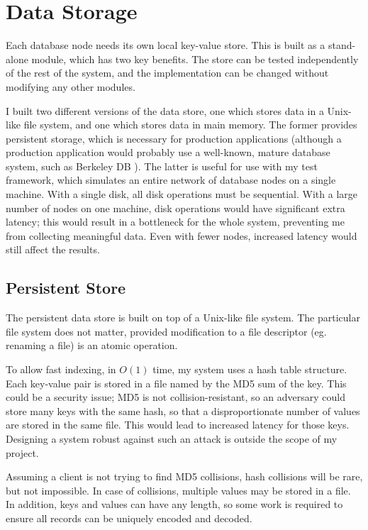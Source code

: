 \documentclass[12pt,a4paper,twoside,openany]{report}
\begin{document}
\section{Data Storage}

Each database node needs its own local key-value store.
This is built as a stand-alone module, which has two key benefits. The store can be tested independently of the rest of the system, and the implementation can be changed without modifying any other modules.

I built two different versions of the data store, one which stores data in a Unix-like file system, and one which stores data in main memory. The former provides persistent storage, which is necessary for production applications (although a production application would probably use a well-known, mature database system, such as Berkeley DB \cite{decandia2007dynamo}). The latter is useful for use with my test framework, which simulates an entire network of database nodes on a single machine.
With a single disk, all disk operations must be sequential. With a large number of nodes on one machine, disk operations would have significant extra latency; this would result in a bottleneck for the whole system, preventing me from collecting meaningful data. Even with fewer nodes, increased latency would still affect the results.

\subsection{Persistent Store}

The persistent data store is built on top of a Unix-like file system. The particular file system does not matter, provided modification to a file descriptor (eg. renaming a file) is an atomic operation.

To allow fast indexing, in $O(1)$ time, my system uses a hash table structure. Each key-value pair is stored in a file named by the MD5 sum of the key. This could be a security issue; MD5 is not collision-resistant, so an adversary could store many keys with the same hash, so that a disproportionate number of values are stored in the same file. This would lead to increased latency for those keys. Designing a system robust against such an attack is outside the scope of my project.

Assuming a client is not trying to find MD5 collisions, hash collisions will be rare, but not impossible. In case of collisions, multiple values may be stored in a file. In addition, keys and values can have any length, so some work is required to ensure all records can be uniquely encoded and decoded.
\end{document}
